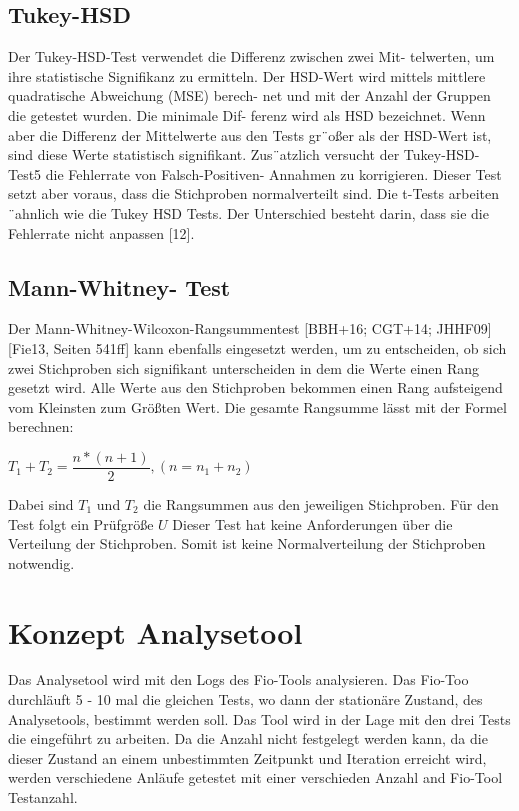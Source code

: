 \subsection{Tukey-HSD}
Der Tukey-HSD-Test verwendet die Differenz zwischen zwei Mit-
telwerten, um ihre statistische Signifikanz zu ermitteln.
Der HSD-Wert wird mittels mittlere quadratische Abweichung (MSE) berech-
net und mit der Anzahl der Gruppen die getestet wurden. Die minimale Dif-
ferenz wird als HSD bezeichnet. Wenn aber die Differenz der Mittelwerte aus
den Tests gr¨oßer als der HSD-Wert ist, sind diese Werte statistisch signifikant.
Zus¨atzlich versucht der Tukey-HSD-Test5 die Fehlerrate von Falsch-Positiven-
Annahmen zu korrigieren. Dieser Test setzt aber voraus, dass die Stichproben
normalverteilt sind. Die t-Tests arbeiten ¨ahnlich wie die Tukey HSD Tests. Der
Unterschied besteht darin, dass sie die Fehlerrate nicht anpassen [12]. 

\subsection{Mann-Whitney-
Test}
Der Mann-Whitney-Wilcoxon-Rangsummentest [BBH+16; CGT+14; JHHF09]
[Fie13, Seiten 541ff] kann ebenfalls eingesetzt werden, um zu entscheiden, ob sich zwei
Stichproben sich signifikant unterscheiden in dem die Werte einen Rang gesetzt wird. 
Alle Werte aus den Stichproben bekommen einen Rang aufsteigend vom Kleinsten zum Größten Wert.
Die gesamte Rangsumme lässt mit der Formel berechnen:
\begin{center}
  $T_1 + T_2 = \dfrac{n * (n + 1)}{2}, (n = n_1 + n_2)$
\end{center}  

Dabei sind $T_1$ und $T_2$ die Rangsummen aus den jeweiligen Stichproben.
Für den Test folgt ein Prüfgröße $U$  
Dieser Test
hat keine Anforderungen über die Verteilung der Stichproben.
Somit ist keine Normalverteilung der Stichproben notwendig.


\section{Konzept Analysetool}
Das Analysetool wird mit den Logs des Fio-Tools analysieren.
Das Fio-Too durchläuft 5 - 10 mal die gleichen Tests, wo dann der stationäre Zustand, des Analysetools,
bestimmt werden soll. Das Tool wird in der Lage mit den drei Tests die eingeführt zu arbeiten.
Da die Anzahl nicht festgelegt werden kann, da die dieser Zustand an einem unbestimmten Zeitpunkt und Iteration erreicht wird,
werden verschiedene Anläufe getestet mit einer verschieden Anzahl and Fio-Tool Testanzahl.

